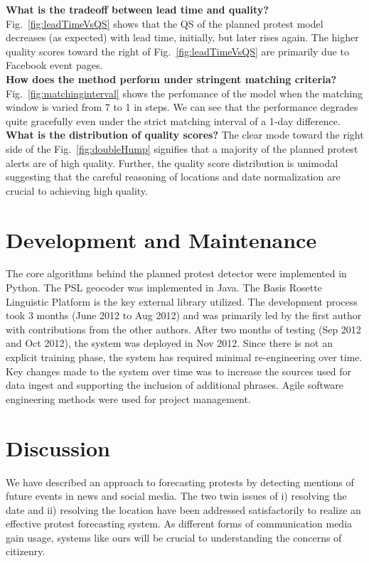 \documentclass[letterpaper]{article}
\begin{document}
\noindent
{\bf What is the tradeoff between lead time and quality?}
Fig.~\ref{fig:leadTimeVsQS} shows that the QS of the planned protest model decreases (as expected) with lead time, initially, but
later rises again. The higher quality scores toward the right of Fig.~\ref{fig:leadTimeVsQS} are primarily due to
Facebook event pages.\\

\noindent
{\bf How does the method perform under stringent matching criteria?}
Fig.~\ref{fig:matchinginterval} shows the perfomance of the model when the matching window is varied from 7 to 1 in steps. 
We can see that the performance degrades quite gracefully even under the strict matching interval of a 1-day difference.\\

\noindent
{\bf What is the distribution of quality scores?}
The clear mode toward the right side of the Fig.~\ref{fig:doubleHump} signifies that a majority of the planned 
protest alerts are of high quality. Further, the quality score distribution is unimodal suggesting that the careful
reasoning of locations and date normalization are crucial to achieving high quality.

\vspace{-0.5em}
\section{Development and Maintenance}
The core algorithms behind the
planned protest detector were implemented in Python. The PSL geocoder was
implemented in Java. The Basis Rosette Linguistic Platform is the key
external library utilized. The development process took 3 months (June
2012 to Aug 2012) and was
primarily led by the first author with contributions from the other authors.
After two months of testing (Sep 2012 and Oct 2012), the system was deployed
in Nov 2012. Since there is not an explicit training
phase, the system has required minimal re-engineering over time. Key changes
made to the system over time was to increase the sources used for data ingest
and supporting the inclusion of additional phrases. Agile software
engineering methods were used for project management.

\vspace{-0.5em}
\section{Discussion}
We have described an approach to forecasting protests by detecting mentions of future events in news and social
media. The two twin issues of i) resolving the date and ii) resolving the location have been addressed satisfactorily
to realize an effective protest forecasting system. As different forms of communication media gain usage, systems
like ours will be crucial to understanding the concerns of citizenry.
\end{document}
